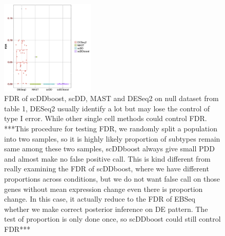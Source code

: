 \documentclass[11pt]{amsart}
\begin{document}
\begin{figure}[H]
\includegraphics[width = 0.4\textwidth]{FDR.png}
 \caption{FDR of scDDboost, scDD, MAST and DESeq2 on null dataset from table 1, DESeq2 usually identify a lot but may lose the control of type I error. While other single cell methods could control FDR. ***This procedure for testing FDR,  we randomly split a population into two samples, so it is highly likely proportion of subtypes remain same among these two samples, scDDboost always give small PDD and almost make no false positive call. This is kind different from really examining the FDR of scDDboost, where we have different proportions across conditions, but we do not want false call on those genes without mean expression change even there is proportion change. In this case, it actually reduce to the FDR of EBSeq whether we make correct posterior inference on DE pattern. The test of proportion is only done once, so scDDboost could still control FDR*** }
  \label{fig:7}
\end{figure}
\end{document}
